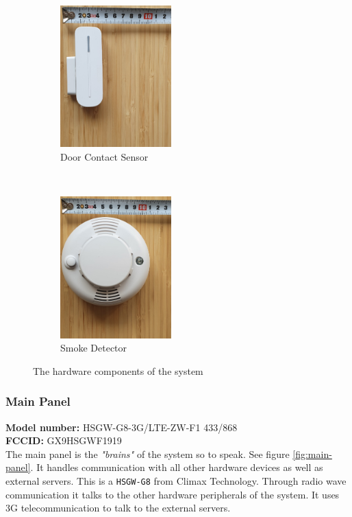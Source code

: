 \begin{figure}[!ht]
    \begin{subfigure}[t]{0.33\textwidth}
        \centering
        \includegraphics[height=2.15in]{images/door-contact.png}
        \caption{Door Contact Sensor}
        \label{fig:door-contact}
    \end{subfigure}%
    ~
    \begin{subfigure}[t]{0.33\textwidth}
        \centering
        \includegraphics[height=2.15in]{images/smoke-detector.png}
        \caption{Smoke Detector}
        \label{fig:smoke-detector}
    \end{subfigure}
    \caption{The hardware components of the system}
    \label{fig:hardware-components}
\end{figure}
\subsubsection{Main Panel}
\textbf{Model number:} HSGW-G8-3G/LTE-ZW-F1 433/868 \\
\textbf{FCCID:} GX9HSGWF1919 \\
The main panel is the \textit{"brains"} of the system so to speak. See figure \ref{fig:main-panel}. It handles communication with all other hardware devices as well as external servers. This is a \texttt{HSGW-G8} from Climax Technology. Through radio wave communication it talks to the other hardware peripherals of the system. It uses 3G telecommunication to talk to the external servers.

